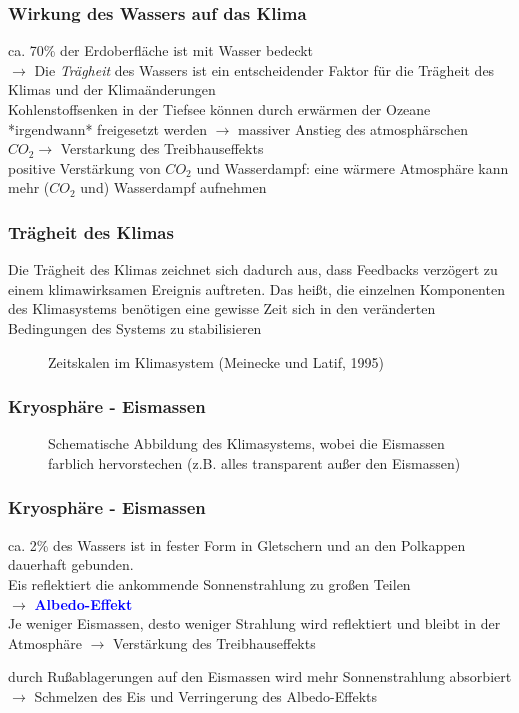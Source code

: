 \begin{frame}
	\frametitle{Wirkung des Wassers auf das Klima}
	ca. 70\% der Erdoberfläche ist mit Wasser bedeckt\\
	$\rightarrow$ Die \textit{Trägheit} des Wassers ist ein entscheidender Faktor für die Trägheit des Klimas und der Klimaänderungen \\%
	Kohlenstoffsenken in der Tiefsee können durch erwärmen der Ozeane *irgendwann* freigesetzt werden $\rightarrow$ massiver Anstieg des atmosphärschen $CO_2 \rightarrow$ Verstarkung des Treibhauseffekts\\
	positive Verstärkung von $CO_2$ und Wasserdampf: eine wärmere Atmosphäre kann mehr ($CO_2$ und) Wasserdampf aufnehmen
\end{frame}

\begin{frame}
	\frametitle{Trägheit des Klimas}
	Die Trägheit des Klimas zeichnet sich dadurch aus, dass Feedbacks verzögert zu einem klimawirksamen Ereignis auftreten. Das heißt, die einzelnen Komponenten des Klimasystems benötigen eine gewisse Zeit sich in den veränderten Bedingungen des Systems zu stabilisieren
	
	
	\begin{figure}
		\caption{Zeitskalen im Klimasystem (Meinecke und Latif, 1995)}
	\end{figure}
\end{frame}

\begin{frame}
	\frametitle{Kryosphäre - Eismassen}
	
	\begin{figure}
		\caption{Schematische Abbildung des Klimasystems, wobei die Eismassen farblich hervorstechen (z.B. alles transparent außer den Eismassen)}
	\end{figure}
\end{frame}

\begin{frame}
	\frametitle{Kryosphäre - Eismassen} %
	ca. 2\% des Wassers ist in fester Form in Gletschern und an den Polkappen dauerhaft gebunden. \\
	Eis reflektiert die ankommende Sonnenstrahlung zu großen Teilen\\
	$\rightarrow$ \textbf{\textcolor{blue}{Albedo-Effekt}}\\
	
	Je weniger Eismassen, desto weniger Strahlung wird reflektiert und bleibt in der Atmosphäre $\rightarrow$ Verstärkung des Treibhauseffekts
	
	
	durch Rußablagerungen auf den Eismassen wird mehr Sonnenstrahlung absorbiert $\rightarrow$ Schmelzen des Eis und Verringerung des Albedo-Effekts %
	
\end{frame}

